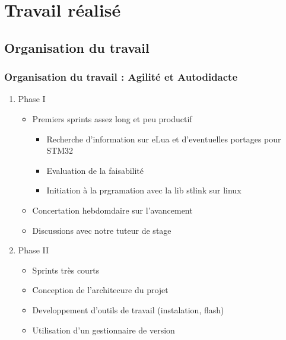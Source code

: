 \documentclass{beamer}
\begin{document}
\section{Travail réalisé}
\subsection{Organisation du travail}
\begin{frame}
\frametitle{Organisation du travail : Agilité et Autodidacte}
\begin{enumerate}
 \item Phase I
\begin{itemize}
\item Premiers sprints assez long et peu productif
\begin{itemize}
\item Recherche d'information sur eLua et d'eventuelles portages pour STM32
\item Evaluation de la faisabilité
\item Initiation à la prgramation avec la lib stlink sur linux
\end{itemize}
\item Concertation hebdomdaire sur l'avancement
\item Discussions avec notre tuteur de stage
\end{itemize}
 \item Phase II
\begin{itemize}
\item Sprints très courts
\item Conception de l'architecure du projet
\item Developpement d'outils de travail (instalation, flash)
\item Utilisation d'un gestionnaire de version
\end{itemize}
\end{enumerate}
\end{frame}
\end{document}
